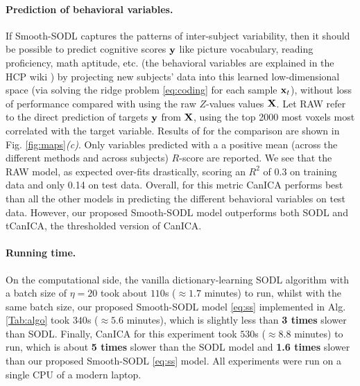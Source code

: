 \paragraph{Prediction of behavioral variables.}
If Smooth-SODL captures the patterns of inter-subject variability, then it should be possible to predict cognitive scores $\mathbf{y}$ like picture vocabulary, reading proficiency, math aptitude, etc. (the behavioral variables are explained in the HCP wiki  \cite{hcpwiki}) by projecting new subjects' data into this learned low-dimensional space (via solving the ridge problem \eqref{eq:coding} for each sample $\mathbf{x}_t$), without loss of performance compared with using the raw $Z$-values values $\mathbf{X}$. Let RAW refer to the direct prediction of targets $\mathbf{y}$ from $\mathbf{X}$, using the top 2000 most voxels most correlated with the target variable. Results of for the comparison are shown in Fig. \ref{fig:maps}\textit{(c)}.  Only variables predicted with a a positive mean (across the different methods and across subjects) $R$-score are reported.
We see that the RAW model, as expected over-fits drastically, scoring an $R^2$ of 0.3 on training data and only 0.14 on test data. Overall, for this metric CanICA performs best than all the other models in predicting the different behavioral variables on test data. However, our proposed Smooth-SODL model outperforms both SODL  \cite{mairal2010} and tCanICA, the thresholded version of CanICA.

  
\paragraph{Running time.} On the computational
side, the vanilla dictionary-learning
SODL algorithm  \cite{mairal2010} with a batch size of
$\eta = 20$ took about $110$s ($\approx 1.7$ minutes) to
run, whilst with the same batch size, our proposed
Smooth-SODL model \eqref{eq:ss} implemented in Alg. \ref{Tab:algo} took
$340$s ($\approx 5.6$ minutes), which is slightly less than \textbf{3 times}
slower than SODL.  Finally, CanICA  \cite{varoquaux2010group} for this experiment
took $530$s ($\approx 8.8$ minutes) to run, which is about \textbf{5 times} slower
than the SODL model and \textbf{1.6 times} slower than our proposed Smooth-SODL
\eqref{eq:ss} model.
All experiments were run on a single CPU of a modern laptop.

